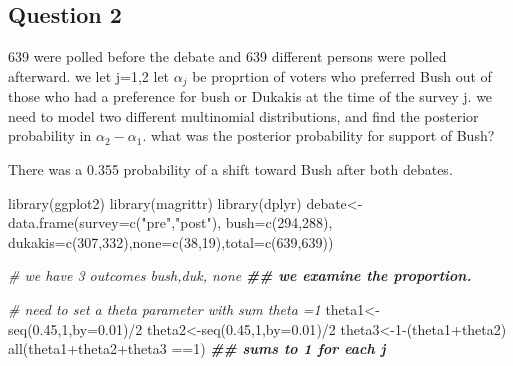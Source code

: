 \documentclass[
]{book}
\newenvironment{Shaded}{\begin{snugshade}}{\end{snugshade}}
\newcommand{\AttributeTok}[1]{\textcolor[rgb]{0.77,0.63,0.00}{#1}}
\newcommand{\CommentTok}[1]{\textcolor[rgb]{0.56,0.35,0.01}{\textit{#1}}}
\newcommand{\DecValTok}[1]{\textcolor[rgb]{0.00,0.00,0.81}{#1}}
\newcommand{\DocumentationTok}[1]{\textcolor[rgb]{0.56,0.35,0.01}{\textbf{\textit{#1}}}}
\newcommand{\FloatTok}[1]{\textcolor[rgb]{0.00,0.00,0.81}{#1}}
\newcommand{\FunctionTok}[1]{\textcolor[rgb]{0.00,0.00,0.00}{#1}}
\newcommand{\NormalTok}[1]{#1}
\newcommand{\OtherTok}[1]{\textcolor[rgb]{0.56,0.35,0.01}{#1}}
\newcommand{\SpecialCharTok}[1]{\textcolor[rgb]{0.00,0.00,0.00}{#1}}
\newcommand{\StringTok}[1]{\textcolor[rgb]{0.31,0.60,0.02}{#1}}
\theoremstyle{definition}
\theoremstyle{definition}
\theoremstyle{definition}
\theoremstyle{definition}
\theoremstyle{remark}
\begin{document}
\hypertarget{question-2}{%
\subsection*{Question 2}\label{question-2}}

639 were polled before the debate and 639 different persons were polled afterward. we let j=1,2 let \(\alpha_j\) be proprtion of voters who preferred Bush out of those who had a preference for bush or Dukakis at the time of the survey j. we need to model two different multinomial distributions, and find the posterior probability in \(\alpha_2-\alpha_1\). what was the posterior probability for support of Bush?

There was a 0.355 probability of a shift toward Bush after both debates.

\begin{Shaded}
\begin{Highlighting}[]
 \FunctionTok{library}\NormalTok{(ggplot2)}
 \FunctionTok{library}\NormalTok{(magrittr)}
\FunctionTok{library}\NormalTok{(dplyr)}
\NormalTok{debate}\OtherTok{\textless{}{-}}\FunctionTok{data.frame}\NormalTok{(}\AttributeTok{survey=}\FunctionTok{c}\NormalTok{(}\StringTok{"pre"}\NormalTok{,}\StringTok{"post"}\NormalTok{), }\AttributeTok{bush=}\FunctionTok{c}\NormalTok{(}\DecValTok{294}\NormalTok{,}\DecValTok{288}\NormalTok{), }\AttributeTok{dukakis=}\FunctionTok{c}\NormalTok{(}\DecValTok{307}\NormalTok{,}\DecValTok{332}\NormalTok{),}\AttributeTok{none=}\FunctionTok{c}\NormalTok{(}\DecValTok{38}\NormalTok{,}\DecValTok{19}\NormalTok{),}\AttributeTok{total=}\FunctionTok{c}\NormalTok{(}\DecValTok{639}\NormalTok{,}\DecValTok{639}\NormalTok{))}

\CommentTok{\# we have 3 outcomes bush,duk, none}
\DocumentationTok{\#\# we examine the proportion.}

\CommentTok{\# need to set a theta parameter with sum theta =1}
\NormalTok{ theta1}\OtherTok{\textless{}{-}}\FunctionTok{seq}\NormalTok{(}\FloatTok{0.45}\NormalTok{,}\DecValTok{1}\NormalTok{,}\AttributeTok{by=}\FloatTok{0.01}\NormalTok{)}\SpecialCharTok{/}\DecValTok{2}
\NormalTok{ theta2}\OtherTok{\textless{}{-}}\FunctionTok{seq}\NormalTok{(}\FloatTok{0.45}\NormalTok{,}\DecValTok{1}\NormalTok{,}\AttributeTok{by=}\FloatTok{0.01}\NormalTok{)}\SpecialCharTok{/}\DecValTok{2}
\NormalTok{ theta3}\OtherTok{\textless{}{-}}\DecValTok{1}\SpecialCharTok{{-}}\NormalTok{(theta1}\SpecialCharTok{+}\NormalTok{theta2)}
 \FunctionTok{all}\NormalTok{(theta1}\SpecialCharTok{+}\NormalTok{theta2}\SpecialCharTok{+}\NormalTok{theta3 }\SpecialCharTok{==}\DecValTok{1}\NormalTok{) }\DocumentationTok{\#\# sums to  1 for each j}
\end{Highlighting}
\end{Shaded}
\end{document}

